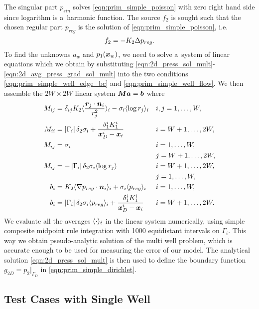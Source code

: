 The singular part $p_{sin}$ solves \eqref{eqn:prim_simple_poisson} with zero right hand side since logarithm is a~harmonic function.
The source $f_2$ is sought such that the chosen regular part $p_{reg}$ is the solution of \eqref{eqn:prim_simple_poisson}, i.e.
\begin{equation}
    f_2 = -K_2 \Delta p_{reg}.
\end{equation}
To find the unknowns $a_w$ and $p_1(\mathbf{\boldsymbol{x}}_w)$, we need to solve a~system of linear equations
which we obtain by substituting \eqref{eqn:2d_press_sol_mult}-\eqref{eqn:2d_avg_press_grad_sol_mult}
into the two conditions \eqref{eqn:prim_simple_well_edge_bc} and \eqref{eqn:prim_simple_well_flow}.
We then assemble the $2W\times 2W$ linear system $\mathbf{\boldsymbol{M}}\mathbf{\boldsymbol{a}} = \mathbf{\boldsymbol{b}}$ where
\begin{subequations}
\label{eqn:2d_press_linear_system}
\begin{align}
M_{ij} &= \delta_{ij} K_2\avg{\frac{\vc r_j \cdot \vc n_i}{r_j^2}}_i - \sigma_i\avg{\log r_j}_i && i,j=1,\ldots,W, \\
%
M_{ii} &= \abs{\Gamma_i}\delta_2\sigma_i + \frac{\delta^i_1 K^i_1}{\bx^i_D-\bx_i} && i=W+1,\ldots,2W,\\
%
M_{ij} &= \sigma_i && i=1,\ldots,W,\\
    &&& j=W+1,\ldots,2W,\\
M_{ij} &= -\abs{\Gamma_i}\delta_2\sigma_i \avg{\log r_j} && i=W+1,\ldots,2W,\\
    &&& j=1,\ldots,W,\\
b_{i} &= K_2 \avg{\grad p_{reg}\cdot \vc n_i}_i + \sigma_i\avg{p_{reg}}_i && i=1,\ldots,W,\\
b_{i} &= \abs{\Gamma_i}\delta_2\sigma_i \avg{p_{reg}}_i + \frac{\delta^i_1 K^i_1}{\bx^i_D-\bx_i} && i=W+1,\ldots,2W.
\end{align}
\end{subequations}
We evaluate all the averages $\langle\cdot\rangle_i$ in the linear system numerically,
using simple composite midpoint rule integration with 1000 equidistant intervals on $\Gamma_i$.
This way we obtain pseudo-analytic solution of the multi well problem, which is accurate enough
to be used for measuring the error of our model.
The analytical solution \eqref{eqn:2d_press_sol_mult} is then used 
to define the boundary function $g_{2D} = p_2|_{\Gamma_D}$ in \eqref{eqn:prim_simple_dirichlet}.


\subsection{Test Cases with Single Well}
\label{sec:results}

